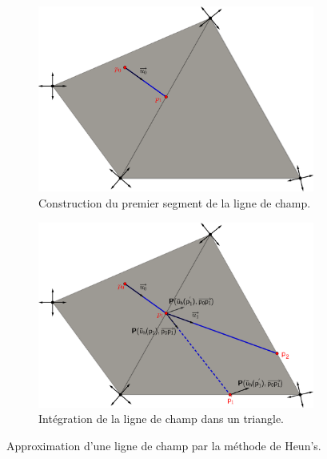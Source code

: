 \begin{figure}[!h]
     \centering
     \begin{subfigure}[b]{0.7\textwidth}
         \centering
         \includegraphics[width=\textwidth]{images/draw_streams_11.pdf}
         \caption{Construction du premier segment de la ligne de champ.}
     \end{subfigure}
     \begin{subfigure}[b]{0.7\textwidth}
         \centering
         \includegraphics[width=\textwidth]{images/draw_streams_12.pdf}
         \caption{Intégration de la ligne de champ dans un triangle.}
     \end{subfigure}
        \caption{Approximation d'une ligne de champ par la méthode de Heun's.}
        \label{fig:draw_streams_1}
\end{figure}

